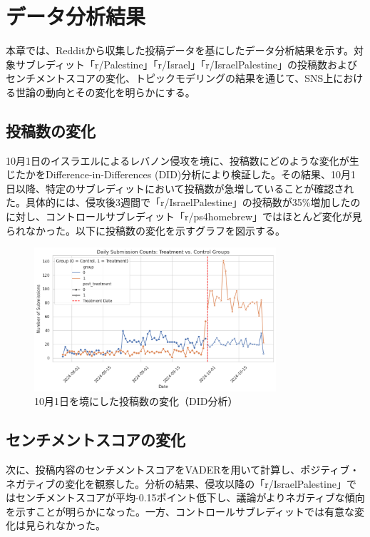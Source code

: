 \documentclass[11pt, a4j]{jreport}
\begin{document}
    \chapter{データ分析結果}

    本章では、Redditから収集した投稿データを基にしたデータ分析結果を示す。対象サブレディット「r/Palestine」「r/Israel」「r/IsraelPalestine」の投稿数およびセンチメントスコアの変化、トピックモデリングの結果を通じて、SNS上における世論の動向とその変化を明らかにする。
    
    \section{投稿数の変化}
    10月1日のイスラエルによるレバノン侵攻を境に、投稿数にどのような変化が生じたかをDifference-in-Differences (DID)分析により検証した。その結果、10月1日以降、特定のサブレディットにおいて投稿数が急増していることが確認された。具体的には、侵攻後3週間で「r/IsraelPalestine」の投稿数が35\%増加したのに対し、コントロールサブレディット「r/ps4homebrew」ではほとんど変化が見られなかった。以下に投稿数の変化を示すグラフを図示する。
    
    \begin{figure}[H]
        \centering
        \includegraphics[width=0.8\textwidth]{submission_count_plot.png}
        \caption{10月1日を境にした投稿数の変化（DID分析）}
    \end{figure}
    
    \section{センチメントスコアの変化}
    次に、投稿内容のセンチメントスコアをVADERを用いて計算し、ポジティブ・ネガティブの変化を観察した。分析の結果、侵攻以降の「r/IsraelPalestine」ではセンチメントスコアが平均-0.15ポイント低下し、議論がよりネガティブな傾向を示すことが明らかになった。一方、コントロールサブレディットでは有意な変化は見られなかった。
    
\end{document}
